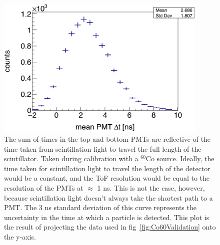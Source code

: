 \begin{figure}
    \centering
    \includegraphics[width = 0.9\textwidth]{Content/Methods/ConstPMTAvgProject.png}
    \caption{
    The sum of times in the top and bottom PMTs are reflective of the time taken from scintillation light to travel the full length of the scintillator.
    Taken during calibration with a $^{60}$Co source.
    Ideally, the time taken for scintillation light to travel the length of the detector would be a constant, and the ToF resolution would be equal to the resolution of the PMTs at $\approx$ 1 ns.
    This is not the case, however, because scintillation light doesn't always take the shortest path to a PMT.
    The 3 ns standard deviation of this curve represents the uncertainty in the time at which a particle is detected.
    This plot is the result of projecting the data used in fig~\ref{fig:Co60Validation} onto the y-axis.
}
    \label{fig:Co60ValidationProject}
\end{figure}

